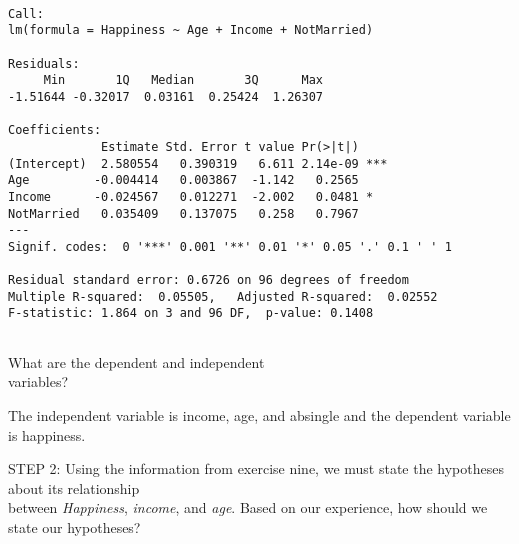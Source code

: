 \documentclass[11pt]{book}\usepackage[]{graphicx}\usepackage[]{color}
\begin{document}
\begin{exercises}
\begin{exercise}
{{}}

{\tiny{
  \begin{verbatim}

Call:
lm(formula = Happiness ~ Age + Income + NotMarried)

Residuals:
     Min       1Q   Median       3Q      Max 
-1.51644 -0.32017  0.03161  0.25424  1.26307 

Coefficients:
             Estimate Std. Error t value Pr(>|t|)    
(Intercept)  2.580554   0.390319   6.611 2.14e-09 ***
Age         -0.004414   0.003867  -1.142   0.2565    
Income      -0.024567   0.012271  -2.002   0.0481 *  
NotMarried   0.035409   0.137075   0.258   0.7967    
---
Signif. codes:  0 '***' 0.001 '**' 0.01 '*' 0.05 '.' 0.1 ' ' 1

Residual standard error: 0.6726 on 96 degrees of freedom
Multiple R-squared:  0.05505,	Adjusted R-squared:  0.02552 
F-statistic: 1.864 on 3 and 96 DF,  p-value: 0.1408


  \end{verbatim}
}}

What are the dependent and independent \\ variables?

    \vspace{5mm}

    \end{exercise}
    \vspace{2mm}
    \begin{solution}      %

       The independent variable is income,   age, and absingle and the dependent variable is happiness.

    \end{solution}

  \begin{exercise} %

    STEP 2: Using the information from exercise nine, we must state the hypotheses about its relationship \\ between  {\textit{Happiness}}, {\textit{income}}, and {\textit{age}}.  Based on our experience, how should we state our hypotheses?

    \vspace{5mm}

    \end{exercise}
    \vspace{2mm}
    \begin{solution}      %


\end{solution}
\end{exercises}
\end{document}
